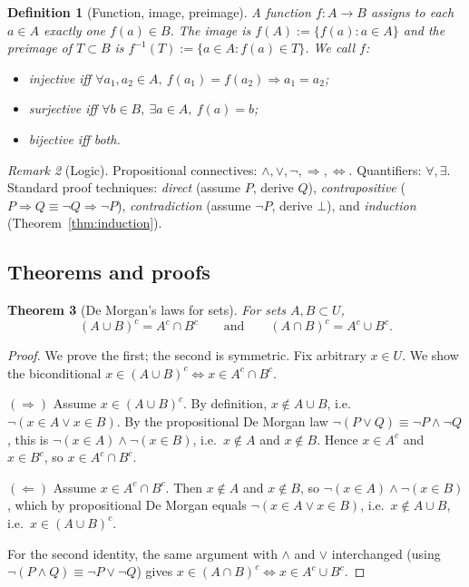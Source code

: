\documentclass[11pt]{article}
\newtheorem{theorem}{Theorem}[section]
\newtheorem{definition}[theorem]{Definition}
\theoremstyle{remark}
\newtheorem{remark}[theorem]{Remark}
\begin{document}
\begin{definition}[Function, image, preimage]
A \emph{function} $f : A \to B$ assigns to each $a \in A$ exactly one $f(a) \in B$. The image is $f(A) := \{f(a) : a \in A\}$ and the preimage of $T \subset B$ is $f^{-1}(T) := \{a \in A : f(a) \in T\}$. We call $f$:
\begin{itemize}
  \item \emph{injective} iff $\forall a_1, a_2 \in A,\ f(a_1) = f(a_2) \Rightarrow a_1 = a_2$;
  \item \emph{surjective} iff $\forall b \in B,\ \exists a \in A,\ f(a) = b$;
  \item \emph{bijective} iff both.
\end{itemize}
\end{definition}

\begin{remark}[Logic]
Propositional connectives: $\land, \lor, \neg, \Rightarrow, \Leftrightarrow$. Quantifiers: $\forall, \exists$. Standard proof techniques: \emph{direct} (assume $P$, derive $Q$), \emph{contrapositive} ($P \Rightarrow Q \equiv \neg Q \Rightarrow \neg P$), \emph{contradiction} (assume $\neg P$, derive $\bot$), and \emph{induction} (Theorem~\ref{thm:induction}).
\end{remark}

\subsection*{Theorems and proofs}

\begin{theorem}[De Morgan's laws for sets]\label{thm:demorgan}
For sets $A, B \subset U$,
\[
(A \cup B)^{c} = A^{c} \cap B^{c}
\qquad\text{and}\qquad
(A \cap B)^{c} = A^{c} \cup B^{c}.
\]
\end{theorem}

\begin{proof}
We prove the first; the second is symmetric. Fix arbitrary $x \in U$. We show the biconditional $x \in (A \cup B)^{c} \Leftrightarrow x \in A^{c} \cap B^{c}$.

\textbf{$(\Rightarrow)$} Assume $x \in (A \cup B)^{c}$. By definition, $x \notin A \cup B$, i.e.\ $\neg(x \in A \lor x \in B)$. By the propositional De Morgan law $\neg(P \lor Q) \equiv \neg P \land \neg Q$, this is $\neg(x \in A) \land \neg(x \in B)$, i.e.\ $x \notin A$ and $x \notin B$. Hence $x \in A^{c}$ and $x \in B^{c}$, so $x \in A^{c} \cap B^{c}$.

\textbf{$(\Leftarrow)$} Assume $x \in A^{c} \cap B^{c}$. Then $x \notin A$ and $x \notin B$, so $\neg(x \in A) \land \neg(x \in B)$, which by propositional De Morgan equals $\neg(x \in A \lor x \in B)$, i.e.\ $x \notin A \cup B$, i.e.\ $x \in (A \cup B)^{c}$.

For the second identity, the same argument with $\land$ and $\lor$ interchanged (using $\neg(P \land Q) \equiv \neg P \lor \neg Q$) gives $x \in (A \cap B)^{c} \Leftrightarrow x \in A^{c} \cup B^{c}$.
\end{proof}
\end{document}
